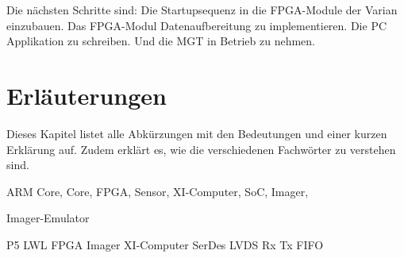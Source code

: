 \documentclass{article}
\begin{document}
Die nächsten Schritte sind: Die Startupsequenz in die FPGA-Module der Varian einzubauen. Das FPGA-Modul Datenaufbereitung zu implementieren. Die PC Applikation zu schreiben. Und die MGT in Betrieb zu nehmen.




\section{Erläuterungen}
Dieses Kapitel listet alle Abkürzungen mit den Bedeutungen und einer kurzen Erklärung auf. Zudem erklärt es, wie die verschiedenen Fachwörter zu verstehen sind.

ARM Core,
Core,
FPGA,
Sensor,
XI-Computer,
SoC,
Imager,

Imager-Emulator

P5
LWL
FPGA
Imager
XI-Computer
SerDes
LVDS
Rx
Tx
FIFO
\end{document}
